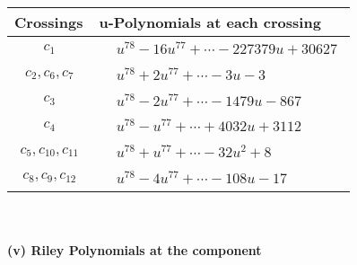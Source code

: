 \documentclass[1p]{elsarticle_modified}
\theoremstyle{definition}
\begin{document}
\begin{tabular}{m{50pt}|m{274pt}}
Crossings & \hspace{64pt}u-Polynomials at each crossing \\
\hline $$\begin{aligned}c_{1}\end{aligned}$$&$\begin{aligned}
&u^{78}-16 u^{77}+\cdots-227379 u+30627
\end{aligned}$\\
\hline $$\begin{aligned}c_{2},c_{6},c_{7}\end{aligned}$$&$\begin{aligned}
&u^{78}+2 u^{77}+\cdots-3 u-3
\end{aligned}$\\
\hline $$\begin{aligned}c_{3}\end{aligned}$$&$\begin{aligned}
&u^{78}-2 u^{77}+\cdots-1479 u-867
\end{aligned}$\\
\hline $$\begin{aligned}c_{4}\end{aligned}$$&$\begin{aligned}
&u^{78}- u^{77}+\cdots+4032 u+3112
\end{aligned}$\\
\hline $$\begin{aligned}c_{5},c_{10},c_{11}\end{aligned}$$&$\begin{aligned}
&u^{78}+u^{77}+\cdots-32 u^2+8
\end{aligned}$\\
\hline $$\begin{aligned}c_{8},c_{9},c_{12}\end{aligned}$$&$\begin{aligned}
&u^{78}-4 u^{77}+\cdots-108 u-17
\end{aligned}$\\
\hline
\end{tabular}\\~\\
\newpage\renewcommand{\arraystretch}{1}
\flushleft \textbf{(v) Riley Polynomials at the component}\newline \\
\end{document}
